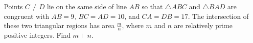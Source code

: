 Points $C\neq D$ lie on the same side of line $AB$ so that $\triangle ABC$ and $\triangle BAD$ are congruent with $AB = 9$, $BC=AD=10$, and $CA=DB=17$.  The intersection of these two triangular regions has area $\tfrac mn$, where $m$ and $n$ are relatively prime positive integers.  Find $m+n$.